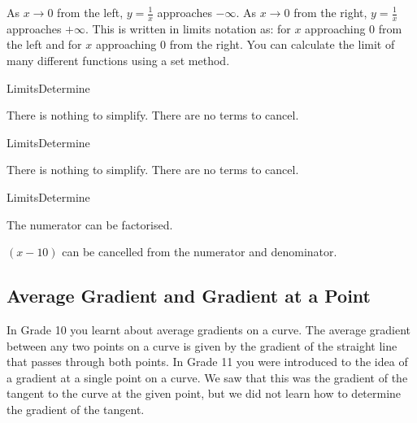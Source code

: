 As $x\to 0$ from the left, $y=\frac{1}{x}$ approaches $-\infty$. As $x\to 0$ from the right, $y=\frac{1}{x}$ approaches $+\infty$. This is written in limits notation as:
for $x$ approaching $0$ from the left and
for $x$ approaching $0$ from the right.
You can calculate the limit of many different functions using a set method.


\begin{wex}{Limits}{Determine }{
There is nothing to simplify.
There are no terms to cancel.

}
\end{wex}

\begin{wex}{Limits}{Determine }{
There is nothing to simplify.
There are no terms to cancel.

}
\end{wex}

\begin{wex}{Limits}{Determine }{
The numerator can be factorised.

$(x-10)$ can be cancelled from the numerator and denominator.


}
\end{wex}

\subsection{Average Gradient and Gradient at a Point}
\label{md:lim:grad}
In Grade 10 you learnt about average gradients on a curve. The average gradient between any two points on a curve is given by the gradient of the straight line that passes through both points. In Grade 11 you were introduced to the idea of a gradient at a single point on a curve. We saw that this was the gradient of the tangent to the curve at the given point, but we did not learn how to determine the gradient of the tangent.

